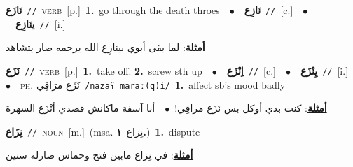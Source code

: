 \documentclass[10pt,a4paper,twoside]{article} %
\begin{document}
\begin{multicols}{2}
{\setlength\topsep{0pt}\textbf{\foreignlanguage{arabic}{نَازَع}}\ {\color{gray}\texttt{//}\color{black}}\ \textsc{verb}\ [p.]\ \textbf{1.}~go through the death throes\ \ $\bullet$\ \ \setlength\topsep{0pt}\textbf{\foreignlanguage{arabic}{نَازِع}}\ {\color{gray}\texttt{//}\color{black}}\ [c.]\ \ $\bullet$\ \ \setlength\topsep{0pt}\textbf{\foreignlanguage{arabic}{ينَازِع}}\ {\color{gray}\texttt{//}\color{black}}\ [i.]\  \begin{flushright}\color{gray}\foreignlanguage{arabic}{\textbf{\underline{\foreignlanguage{arabic}{أمثلة}}}: لما بقى أبوي بينازِع الله يرحمه صار يتشاهد}\end{flushright}\color{black}} \vspace{2mm}

{\setlength\topsep{0pt}\textbf{\foreignlanguage{arabic}{نَزَع}}\ {\color{gray}\texttt{//}\color{black}}\ \textsc{verb}\ [p.]\ \textbf{1.}~take off.  \textbf{2.}~screw sth up\ \ $\bullet$\ \ \setlength\topsep{0pt}\textbf{\foreignlanguage{arabic}{اِنْزَع}}\ {\color{gray}\texttt{//}\color{black}}\ [c.]\ \ $\bullet$\ \ \setlength\topsep{0pt}\textbf{\foreignlanguage{arabic}{يِنْزَع}}\ {\color{gray}\texttt{//}\color{black}}\ [i.]\ \ $\bullet$\ \ \textsc{ph.} \color{gray} \foreignlanguage{arabic}{نَزَع مرَاقِي}\color{black}\ {\color{gray}\texttt{/{\sffamily nazaʕ maraː(q)i}/}\color{black}}\ \textbf{1.}~affect sb's mood badly\  \begin{flushright}\color{gray}\foreignlanguage{arabic}{\textbf{\underline{\foreignlanguage{arabic}{أمثلة}}}: كنت بدي أوكل بس نَزَع مراقِي!\ $\bullet$\ \  أنا آسفة ماكانش قصدي أنْزَع السهرة}\end{flushright}\color{black}} \vspace{2mm}

{\setlength\topsep{0pt}\textbf{\foreignlanguage{arabic}{نِزَاع}}\ {\color{gray}\texttt{//}\color{black}}\ \textsc{noun}\ [m.]\ \color{gray}(msa. \foreignlanguage{arabic}{نِزاع}~\foreignlanguage{arabic}{\textbf{١.}})\color{black}\ \textbf{1.}~dispute\  \begin{flushright}\color{gray}\foreignlanguage{arabic}{\textbf{\underline{\foreignlanguage{arabic}{أمثلة}}}: في نِزاع مابين فتح وحماس صارله سنين}\end{flushright}\color{black}} \vspace{2mm}


\end{multicols}
\end{document}
